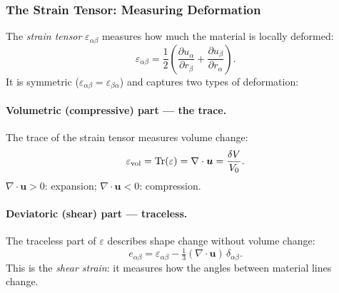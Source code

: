 \documentclass[12pt,letterpaper]{article}
\theoremstyle{definition}
\begin{document}
\subsubsection{The Strain Tensor: Measuring Deformation}

The \emph{strain tensor} $\varepsilon_{\alpha\beta}$ measures how much
the material is locally deformed:
\begin{equation}
  \varepsilon_{\alpha\beta} = \frac{1}{2}
  \left(\frac{\partial u_\alpha}{\partial r_\beta}
      + \frac{\partial u_\beta}{\partial r_\alpha}\right).
  \label{eq:strain}
\end{equation}
It is symmetric ($\varepsilon_{\alpha\beta} = \varepsilon_{\beta\alpha}$)
and captures two types of deformation:

\paragraph{Volumetric (compressive) part --- the trace.}
The trace of the strain tensor measures volume change:
\begin{equation}
  \varepsilon_{\rm vol} = \operatorname{Tr}(\varepsilon)
  = \nabla\cdot\bm{u}
  = \frac{\delta V}{V_0}.
  \label{eq:volumetric}
\end{equation}
$\nabla\cdot\bm{u} > 0$: expansion; $\nabla\cdot\bm{u} < 0$: compression.

\paragraph{Deviatoric (shear) part --- traceless.}
The traceless part of $\varepsilon$ describes shape change without
volume change:
\begin{equation}
  e_{\alpha\beta} = \varepsilon_{\alpha\beta}
  - \tfrac{1}{3}(\nabla\cdot\bm{u})\,\delta_{\alpha\beta}.
  \label{eq:deviatoric}
\end{equation}
This is the \emph{shear strain}: it measures how the angles between
material lines change.
\end{document}
